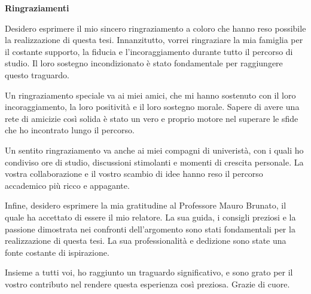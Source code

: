 \thispagestyle{empty}

\begin{center}
  {\bf \Huge Ringraziamenti}
\end{center}

\vspace{4cm}
Desidero esprimere il mio sincero ringraziamento a coloro che hanno reso
possibile la realizzazione di questa tesi. Innanzitutto, vorrei ringraziare la
mia famiglia per il costante supporto, la fiducia e l'incoraggiamento durante
tutto il percorso di studio. Il loro sostegno incondizionato è stato
fondamentale per raggiungere questo traguardo.

Un ringraziamento speciale va ai miei amici, che mi hanno sostenuto con il loro
incoraggiamento, la loro positività e il loro sostegno morale. Sapere di avere
una rete di amicizie così solida è stato un vero e proprio motore nel superare
le sfide che ho incontrato lungo il percorso.

Un sentito ringraziamento va anche ai miei compagni di univeristà, con i quali
ho condiviso ore di studio, discussioni stimolanti e momenti di crescita
personale. La vostra collaborazione e il vostro scambio di idee hanno reso il
percorso accademico più ricco e appagante.

Infine, desidero esprimere la mia gratitudine al Professore Mauro Brunato,  il
quale ha accettato di essere il mio relatore. La sua guida, i consigli preziosi
e la passione dimostrata nei confronti dell'argomento sono stati fondamentali
per la realizzazione di questa tesi. La sua professionalità e dedizione sono
state una fonte costante di ispirazione.

Insieme a tutti voi, ho raggiunto un traguardo significativo, e sono grato per
il vostro contributo nel rendere questa esperienza così preziosa. Grazie di
cuore.
